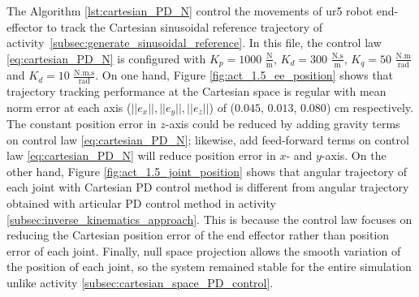 The Algorithm \ref{lst:cartesian_PD_N} control the movements of ur5 robot end-effector to track the Cartesian sinusoidal reference trajectory of activity~\ref{subsec:generate_sinusoidal_reference}. In this file, the control law \eqref{eq:cartesian_PD_N} is configured with ${K_{p}}=1000$ $\mathrm{\frac{N}{m}}$, $K_{d}= 300$ $\mathrm{\frac{N.s}{m}}$, ${K_{q}}=50$ $\mathrm{\frac{N.m}{rad}}$ and $K_{d}= 10$ $\mathrm{\frac{N.m.s}{rad}}$. On one hand, Figure \ref{fig:act_1.5_ee_position} shows that trajectory tracking performance at the Cartesian space is regular with mean norm error at each axis ($||e_x||, ||e_y||, ||e_z||$) of ($0.045$, $0.013$, $0.080$) cm respectively. The constant position error in $z$-axis could be reduced by adding gravity terms on control law \eqref{eq:cartesian_PD_N}; likewise, add feed-forward terms on control law \eqref{eq:cartesian_PD_N} will reduce position error in $x$- and $y$-axis. On the other hand, Figure \ref{fig:act_1.5_joint_position} shows that angular trajectory of each joint with Cartesian PD control method is different from angular trajectory obtained with articular PD control method in activity \ref{subsec:inverse_kinematics_approach}. This is because the control law focuses on reducing the Cartesian position error of the end effector rather than position error of each joint. Finally, null space projection allows the smooth variation of the position of each joint, so the system remained stable for the entire simulation unlike activity \ref{subsec:cartesian_space_PD_control}. \vspace{.5cm}

